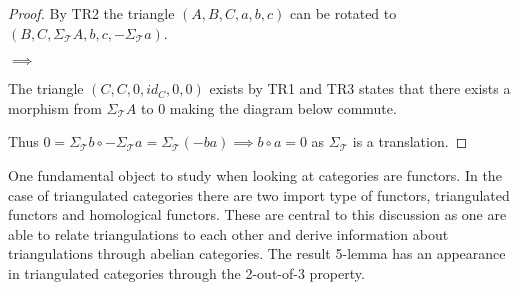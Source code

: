     \begin{proof}
        By TR2 the triangle $(A,B,C,a,b,c)$ can be rotated to $(B,C,\Sigma_{\mathcal{T}}A,b,c,-\Sigma_{\mathcal{T}}a)$.
        \begin{center}
             $\implies$
        \end{center}
        The triangle $(C,C,0,id_C,0,0)$ exists by TR1 and TR3 states that there exists a morphism from $\Sigma_{\mathcal{T}}A$ to 0 making the diagram below commute.
        \begin{center}
        \end{center}
        Thus $0 = \Sigma_{\mathcal{T}}b\circ -\Sigma_{\mathcal{T}}a = \Sigma_{\mathcal{T}}(-ba) \implies b\circ a = 0$ as $\Sigma_{\mathcal{T}}$ is a translation.
    \end{proof}
    One fundamental object to study when looking at categories are functors. In the case of triangulated categories there are two import type of functors, triangulated functors and homological functors. These are central to this discussion as one are able to relate triangulations to each other and derive information about triangulations through abelian categories. The result 5-lemma has an appearance in triangulated categories through the 2-out-of-3 property.
    
